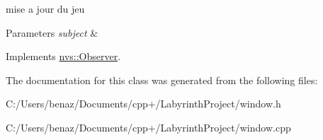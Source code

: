 mise a jour du jeu 


\begin{DoxyParams}{Parameters}
{\em subject} & \\
\hline
\end{DoxyParams}


Implements \mbox{\hyperlink{classnvs_1_1_observer_a4c0373c644180bdc48558e5248968b3a}{nvs\+::\+Observer}}.



The documentation for this class was generated from the following files\+:\begin{DoxyCompactItemize}
\item 
C\+:/\+Users/benaz/\+Documents/cpp+/\+Labyrinth\+Project/window.\+h\item 
C\+:/\+Users/benaz/\+Documents/cpp+/\+Labyrinth\+Project/window.\+cpp\end{DoxyCompactItemize}
